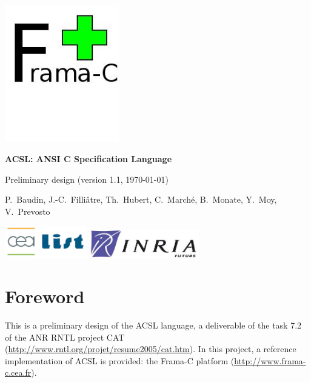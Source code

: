 \documentclass[a4paper,11pt,twoside,openright]{report}
\begin{document}
\sloppy
{}

\begin{titlepage}
\begin{center}
~\vfill

\includegraphics[height=60mm]{FramaC.jpg}

\vspace{20mm}

{\Huge\bfseries ACSL: ANSI C Specification Language}

\bigskip

{\LARGE Preliminary design (version 1.1, \today)}

\vspace{20mm}

{P.~Baudin, J.-C.~Filli\^atre, Th.~Hubert,
  C.~March\'e, B.~Monate, Y.~Moy, V.~Prevosto}

\vspace{20mm}

\vfill

\includegraphics[height=14mm]{cealistlogo.jpg}
\hfill
\includegraphics[height=12mm]{inriafuturslogoshort.jpg}

\end{center}
\end{titlepage}

\clearpage
\label{chap:contents}
\tableofcontents

\chapter*{Foreword}

This is a preliminary design of the ACSL language, a deliverable of
the task 7.2 of the ANR RNTL project CAT
(\url{http://www.rntl.org/projet/resume2005/cat.htm}). In this
project, a reference implementation of ACSL is provided: the Frama-C
platform (\url{http://www.frama-c.cea.fr}).
\end{document}
